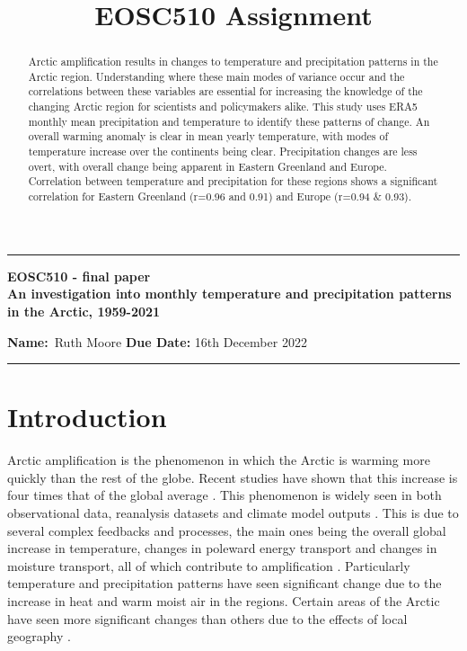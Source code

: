 \documentclass[11pt, oneside]{article}
\title{EOSC510 Assignment }
\begin{document}
\begin{center}
	\hrule
	\vspace{.4cm}
	{\textbf { \large EOSC510 - final paper \\ An investigation into monthly temperature
and precipitation patterns in the Arctic, 1959-2021}}
\end{center}
{\textbf{Name:}\ Ruth Moore \hspace{\fill} }\textbf{Due Date:} 16th December 2022   \\
	\hrule


\hfill
\hfill
 \hfill
\hfill

\begin{abstract}
  Arctic amplification results in changes to temperature and precipitation patterns in the Arctic region. Understanding where these main modes of variance occur and the correlations between these variables are essential for increasing the knowledge of the changing Arctic region for scientists and policymakers alike. This study uses ERA5 monthly mean precipitation and temperature to identify these patterns of change. An overall warming anomaly is clear in mean yearly temperature, with modes of temperature increase over the continents being clear. Precipitation changes are less overt, with overall change being apparent in Eastern Greenland and Europe. Correlation between temperature and precipitation for these regions shows a significant correlation for Eastern Greenland (r=0.96 and 0.91) and Europe (r=0.94 \& 0.93).
   \end{abstract}
\section{Introduction}

Arctic amplification is the phenomenon in which the Arctic is warming more quickly than the rest of the globe. 
Recent studies have shown that this increase is four times that of the global average \cite{rantanen2022arctic}. 
This phenomenon is widely seen in both observational data, reanalysis datasets and climate model outputs \cite{chylek2022annual}.  This is due to several complex feedbacks and processes, the main ones being the overall global increase in temperature, changes in poleward energy transport and changes in moisture transport, all of which contribute to amplification \cite{serreze2011processes}. Particularly temperature and precipitation patterns have seen significant change due to the increase in heat and warm moist air in the regions. Certain areas of the Arctic have seen more significant changes than others due to the effects of local geography \cite{stuecker2018polar}.
 
\end{document}
